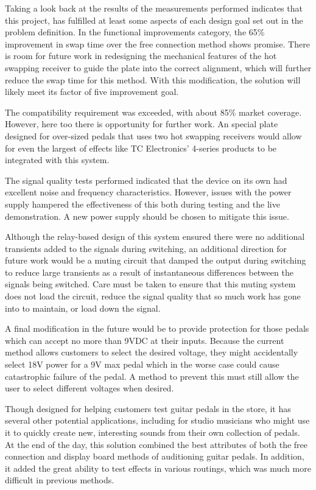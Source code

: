 Taking a look back at the results of the measurements performed indicates that this project, has fulfilled at least some aspects of each design goal set out in the problem definition.  In the functional improvements category, the 65\% improvement in swap time over the free connection method shows promise.  There is room for future work in redesigning the mechanical features of the hot swapping receiver to guide the plate into the correct alignment, which will further reduce the swap time for this method.  With this modification, the solution will likely meet its factor of five improvement goal.

The compatibility requirement was exceeded, with about 85\% market coverage.  However, here too there is opportunity for further work.  An special plate designed for over-sized pedals that uses two hot swapping receivers would allow for even the largest of effects like TC Electronics' 4-series products to be integrated with this system.

The signal quality tests performed indicated that the device on its own had excellent noise and frequency characteristics.  However, issues with the power supply hampered the effectiveness of this both during testing and the live demonstration.  A new power supply should be chosen to mitigate this issue.

Although the relay-based design of this system ensured there were no additional transients added to the signals during switching, an additional direction for future work would be a muting circuit that damped the output during switching to reduce large transients as a result of instantaneous differences between the signals being switched.  Care must be taken to ensure that this muting system does not load the circuit, reduce the signal quality that so much work has gone into to maintain, or load down the signal.

A final modification in the future would be to provide protection for those pedals which can accept no more than 9VDC at their inputs.  Because the current method allows customers to select the desired voltage, they might accidentally select 18V power for a 9V max pedal which in the worse case could cause catastrophic failure of the pedal.  A method to prevent this must still allow the user to select different voltages when desired.  

Though designed for helping customers test guitar pedals in the store, it has several other potential applications, including for studio musicians who might use it to quickly create new, interesting sounds from their own collection of pedals.  At the end of the day, this solution combined the best attributes of both the free connection and display board methods of auditioning guitar pedals.  In addition, it added the great ability to test effects in various routings, which was much more difficult in previous methods.